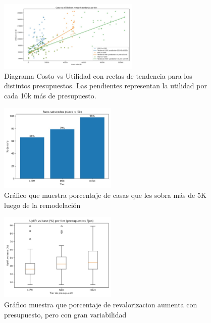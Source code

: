 \begin{figure}[ht]
\centering
\includegraphics[width=0.6\textwidth]{figures/utilidad vs costo.jpg}
\caption{Diagrama Costo vs Utilidad con rectas de tendencia para los distintos presupuestos. Las pendientes representan la utilidad por cada 10k más de presupuesto.}
\label{fig:costo vs utilidad}
\end{figure}

\begin{figure}[ht]
	\begin{center}
	\includegraphics[width=0.5\textwidth]{figures/slacks saturados.jpg}
	\caption[]{Gráfico que muestra porcentaje de casas que les sobra más de 5K luego de la remodelación}
	\label{fig:slackssaturados}
	\end{center}
\end{figure}

\begin{figure}[ht]
	\begin{center}
	\includegraphics[width=0.5\textwidth]{figures/uplift vs base.jpg}
	\caption[]{Gráfico muestra que porcentaje de revalorizacion aumenta con presupuesto, pero con gran variabilidad}
	\label{fig:uplift}
	\end{center}
\end{figure}

